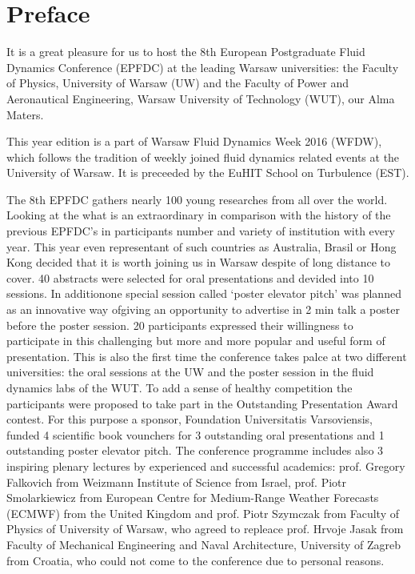 \section*{Preface}

\vspace{.5cm}

It is a great pleasure for us to host the 8th European Postgraduate Fluid Dynamics Conference (EPFDC) at the leading Warsaw universities: the Faculty of Physics, University of Warsaw (UW) and the Faculty of Power and Aeronautical Engineering, Warsaw University of Technology (WUT), our Alma Maters. 

This year edition is a part of Warsaw Fluid Dynamics Week 2016 (WFDW), which follows the tradition of weekly joined fluid dynamics related events at the University of Warsaw. It is preceeded by the EuHIT School on Turbulence (EST).

The 8th EPFDC gathers nearly 100 young researches from all over the world. Looking at the what is an extraordinary in comparison with the history of the previous EPFDC’s in participants number and variety of institution with every year. This year even representant of such countries as Australia, Brasil or Hong Kong decided that it is worth joining us in Warsaw despite of long distance to cover. 40 abstracts were selected for oral presentations and devided into 10 sessions. In additionone special session called ‘poster elevator pitch’ was planned as an innovative way ofgiving an opportunity to advertise in 2 min talk a poster before the poster session. 20 participants expressed their willingness to participate in this challenging but more and more popular and useful form of presentation. This is also the first time the conference takes palce at two different universities: the oral sessions at the UW and the poster session in the fluid dynamics labs of the WUT. To add a sense of healthy competition the participants were proposed to take part in the Outstanding Presentation Award contest. For this purpose a sponsor, Foundation Universitatis Varsoviensis, funded 4 scientific book vounchers for 3 outstanding oral presentations and 1 outstanding poster elevator pitch. The conference programme includes also 3 inspiring plenary lectures by experienced and successful academics: prof. Gregory Falkovich from Weizmann Institute of Science from Israel, prof. Piotr Smolarkiewicz from European Centre for Medium-Range Weather Forecasts (ECMWF) from the United Kingdom and prof. Piotr Szymczak from Faculty of Physics of University of Warsaw, who agreed to repleace prof. Hrvoje Jasak from Faculty of Mechanical Engineering and Naval Architecture, University of Zagreb from Croatia, who could not come to the conference due to personal reasons.

